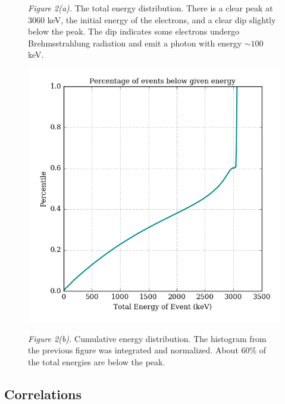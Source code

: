 \documentclass[12pt]{article}
\begin{document}
\begin{center}
\begin{figure}
\textit{Figure 2(a).} The total energy distribution. There is a clear peak at 3060 keV, the initial energy of the electrons, and a clear dip slightly below the peak. The dip indicates some electrons undergo Brehmsstrahlung radiation and emit a photon with energy $\sim 100$ keV.
\end{figure}
\begin{figure}
\includegraphics[scale=0.9]{../percentile.png}

\textit{Figure 2(b).} Cumulative energy distribution. The histogram from the previous figure was integrated and normalized. About 60$\%$ of the total energies are below the peak. 
\end{figure}
\end{center}

\subsection{Correlations}
\end{document}
